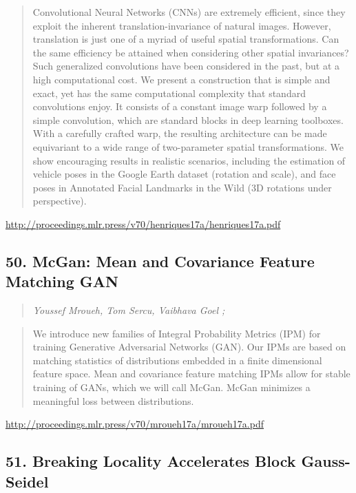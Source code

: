 \documentclass{article}
\begin{document}
\begin{quote}
    Convolutional Neural Networks (CNNs) are extremely efficient, since they exploit the inherent translation-invariance of natural images. However, translation is just one of a myriad of useful spatial transformations. Can the same efficiency be attained when considering other spatial invariances? Such generalized convolutions have been considered in the past, but at a high computational cost. We present a construction that is simple and exact, yet has the same computational complexity that standard convolutions enjoy. It consists of a constant image warp followed by a simple convolution, which are standard blocks in deep learning toolboxes. With a carefully crafted warp, the resulting architecture can be made equivariant to a wide range of two-parameter spatial transformations. We show encouraging results in realistic scenarios, including the estimation of vehicle poses in the Google Earth dataset (rotation and scale), and face poses in Annotated Facial Landmarks in the Wild (3D rotations under perspective).  
\end{quote}

\href{http://proceedings.mlr.press/v70/henriques17a/henriques17a.pdf}{http://proceedings.mlr.press/v70/henriques17a/henriques17a.pdf}

\subsection{50. McGan: Mean and Covariance Feature Matching GAN}

\begin{quote}
\footnotesize{\textit{Youssef Mroueh, Tom Sercu, Vaibhava Goel ;}}

\end{quote}

\begin{quote}
    We introduce new families of Integral Probability Metrics (IPM) for training Generative Adversarial Networks (GAN). Our IPMs are based on matching statistics of distributions embedded in a finite dimensional feature space. Mean and covariance feature matching IPMs allow for stable training of GANs, which we will call McGan. McGan minimizes a meaningful loss between distributions.  
\end{quote}

\href{http://proceedings.mlr.press/v70/mroueh17a/mroueh17a.pdf}{http://proceedings.mlr.press/v70/mroueh17a/mroueh17a.pdf}

\subsection{51. Breaking Locality Accelerates Block Gauss-Seidel}
\end{document}
